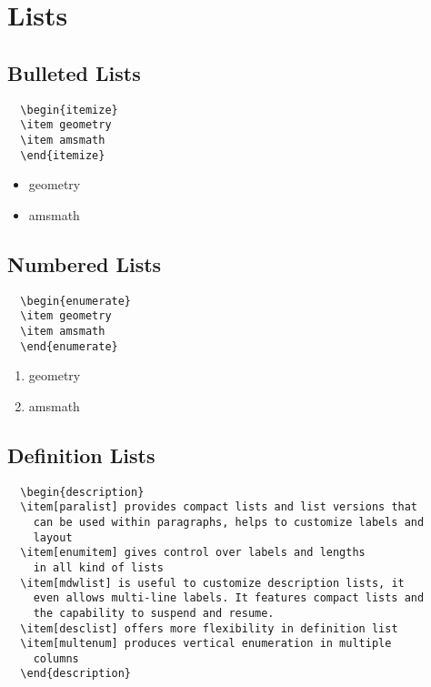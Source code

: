 
\chapter{Lists}
\label{cha:lists}


\section{Bulleted Lists}

\begin{lstlisting}
  \begin{itemize}
  \item geometry
  \item amsmath
  \end{itemize}
\end{lstlisting}


\begin{itemize}
\item geometry
\item amsmath
\end{itemize}


\section{Numbered Lists}
\begin{lstlisting}
  \begin{enumerate}
  \item geometry
  \item amsmath
  \end{enumerate}
\end{lstlisting}


\begin{enumerate}
\item geometry
\item amsmath
\end{enumerate}




\section{Definition Lists}
\begin{lstlisting}
  \begin{description}
  \item[paralist] provides compact lists and list versions that
    can be used within paragraphs, helps to customize labels and
    layout
  \item[enumitem] gives control over labels and lengths
    in all kind of lists
  \item[mdwlist] is useful to customize description lists, it
    even allows multi-line labels. It features compact lists and
    the capability to suspend and resume.
  \item[desclist] offers more flexibility in definition list
  \item[multenum] produces vertical enumeration in multiple
    columns
  \end{description}
\end{lstlisting}


